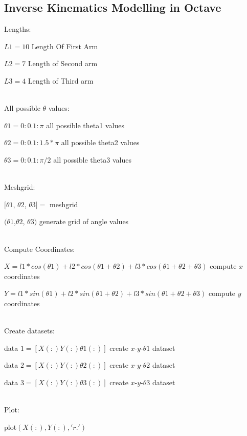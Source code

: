\documentclass[12pt]{article}
\begin{document}
\subsection{Inverse Kinematics Modelling in Octave}
Lengths: \\
\centerline{$L1 = 10 $  Length Of First Arm}
\centerline{$L2 = 7 $  Length of Second arm}
\centerline{$L3 = 4 $  Length of Third arm}
\\[1\baselineskip]
All possible $\theta$ values: \\
\centerline{$\theta 1 = 0:0.1:\pi$  all possible theta1 values}
\centerline{$\theta 2 = 0:0.1:1.5*\pi$  all possible theta2 values}
\centerline{$\theta 3 = 0:0.1:\pi/2$  all possible theta3 values}
\\[1\baselineskip]
Meshgrid: \\
\centerline{$[ \theta{1} $, $ \theta{2} $, $ \theta{3} ] = $ meshgrid} \centerline{$ (\theta1 $,$ \theta2 $, $ \theta3) $  generate grid of angle values}
\\[1\baselineskip]
Compute Coordinates:\\
\centerline{$X = l1 * cos(\theta 1) + l2 * cos(\theta 1 + \theta 2) + l3 * cos(\theta 1 + \theta 2 + \theta 3) $  compute $x$ coordinates}
\centerline{$Y = l1 * sin(\theta 1) + l2 * sin(\theta 1 + \theta 2) + l3 * sin(\theta 1 + \theta 2 + \theta 3) $  compute $y$ coordinates}
\\[1\baselineskip]
Create datasets:\\
\centerline{data $1 = [X(:) Y(:) \theta 1(:)] $ create $x$-$y$-$\theta1$  dataset}
\centerline{data $2 = [X(:) Y(:) \theta 2(:)] $ create $x$-$y$-$\theta2$  dataset}
\centerline{data $3 = [X(:) Y(:) \theta 3(:)] $ create $x$-$y$-$\theta3$  dataset}
\\[1\baselineskip]
Plot:\\
\centerline{plot$(X(:),Y(:),'r.')$}
\end{document}
